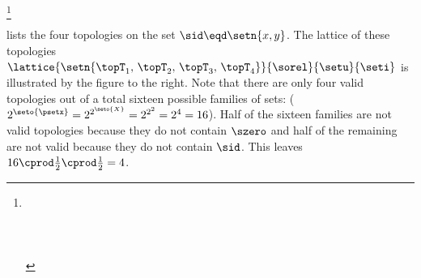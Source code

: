 \begin{theorem}
\footnote{
       \\
  \\  %
  \\ %
  \\ %
  }
\label{thm:ts_lattice_of_topologies}
\end{theorem}




\begin{minipage}{\tw-80mm}%
\begin{example}
\label{ex:set_lat_top_xy}
\footnotemark
{}
 lists the four topologies on the set $\sid\eqd\setn{x,y}$.
The lattice of these topologies
$\lattice{\setn{\topT_1,\, \topT_2,\, \topT_3,\, \topT_4}}{\sorel}{\setu}{\seti}$
is illustrated by the figure to the right.
Note that there are only four valid topologies out of a total sixteen
possible families of sets:
($2^{\seto{\psetx}} = 2^{2^{\seto{X}}} = 2^{2^2} = 2^4 = 16$).
Half of the sixteen families are not valid topologies because they do not contain
$\szero$ and half of the remaining are not valid because they do not contain $\sid$.
This leaves $16 \cprod \frac{1}{2} \cprod \frac{1}{2} = 4$.
\end{example}
\end{minipage}%
\hfill%
%
\begin{minipage}{75mm}%
\begin{center}%
\begin{fsL}%
%
\end{fsL}%
\end{center}%
\end{minipage}

